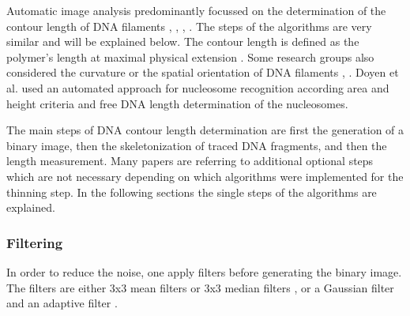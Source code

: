 \documentclass{article}
\begin{document}
Automatic image analysis predominantly focussed on the determination of the contour length of DNA filaments  \cite{spisz1998automated},  \cite{sanchez2002accuracy},  \cite{sundstrom2012image},  \cite{marturelliautomated}. The steps of the algorithms are very similar and will be explained below. The contour length is defined as the polymer’s length at maximal physical extension  \cite{rivetti2001accurate}.  Some research groups also considered the curvature or the spatial orientation of DNA filaments  \cite{ficarra2005automated},  \cite{ficarra2005automatic}. 
Doyen et al. used an automated approach for nucleosome recognition according area and height criteria and free DNA length determination of the nucleosomes.

The main steps of DNA contour length determination are first the generation of a binary image, then the skeletonization of traced DNA fragments, and then the length measurement. Many papers are referring to additional optional steps which are not necessary depending on which algorithms were implemented for the thinning step. In the following sections the single steps of the algorithms are explained. 
\subsubsection{Filtering}
In order to reduce the noise, one apply filters before generating the binary image. The filters are either 3x3 mean filters  \cite{rigotti2005quantitative} or 3x3 median filters  \cite{ficarra2005automatic},  \cite{ficarra2002automated} or a Gaussian filter and an adaptive filter  \cite{ficarra2005automated}. 
\end{document}
